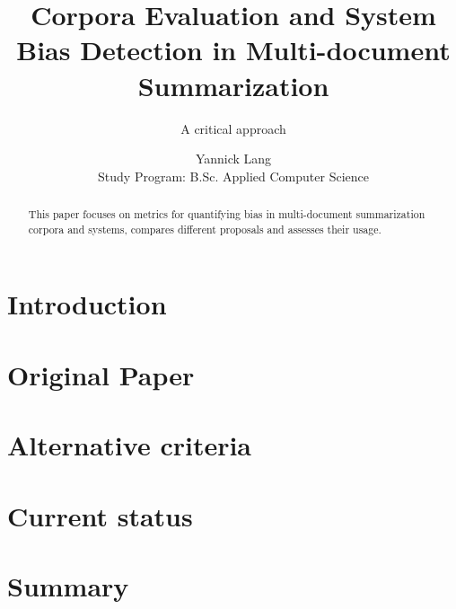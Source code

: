 \documentclass[runningheads]{llncs}
\begin{document}
\title{Corpora Evaluation and System Bias Detection in Multi-document Summarization}
\subtitle{A critical approach}
\author{Yannick Lang \\
    \small Study Program: B.Sc. Applied Computer Science }

\maketitle              %


\begin{abstract}
    This paper focuses on metrics for quantifying bias in multi-document summarization corpora and systems, compares different proposals and assesses their usage.
    
    
\end{abstract}

\section{Introduction}
\label{sec:introcution}


\section{Original Paper}
\label{sec:original-paper}


\section{Alternative criteria}
\label{sec:alternative-criteria}


\section{Current status}
\label{sec:current-status}


\section{Summary}
\label{sec:summary}





\end{document}
